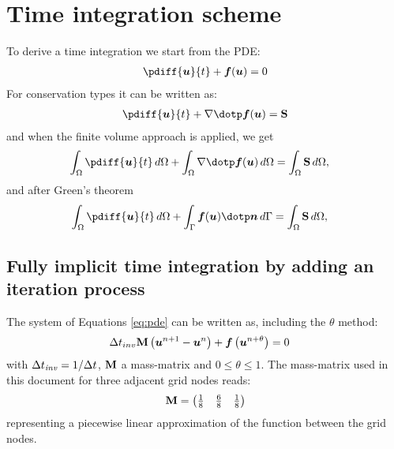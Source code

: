 \chapter{Time integration scheme}\label{sec:time_integration}
To derive a time integration we start from the PDE:
\begin{align}
    \pdiff{\vec{u}}{t} + \vec{f}(\vec{u}) = 0\label{eq:pde}
\end{align}
For conservation types it can be written as:
\begin{align}
    \pdiff{\vec{u}}{t} + \nabla \dotp \vec{f}(\vec{u}) = \mat{S}
\end{align}
and when the finite volume approach is applied, we get
\begin{align}
    \int_\Omega \pdiff{\vec{u}}{t}\, d\Omega + \int_\Omega \nabla \dotp \vec{f}(\vec{u})\, d\Omega&= \int_\Omega \mat{S}\, d\Omega,
\end{align}
and after Green's theorem
\begin{align}
    \int_\Omega \pdiff{\vec{u}}{t}\, d\Omega + \int_\Gamma \vec{f}(\vec{u}) \dotp \vec{n}\, d\Gamma&= \int_\Omega \mat{S}\, d\Omega,
\end{align}
\section{Fully implicit time integration by adding an iteration process}\label{sec:fully_implicit}
The system of Equations \eqref{eq:pde} can be written as, including the $\theta$ method:
\begin{align}
    &\Delta t_{inv} \mbox{\boldmath ${\rm M}$} \left( \bm{u}^{n+1} - \bm{u}^{n} \right)  +
    \bm{f} \left( \bm{u}^{n+\theta} \right) = 0 \label{eq:discretized}
\end{align}
with $\Delta t_{\it inv} = 1/\Delta t$, $\mbox{\boldmath ${\rm M}$}$ a mass-matrix and $0 \leq \theta \leq 1$.
The mass-matrix used in this document for three adjacent grid nodes reads:
\begin{align}
    \mbox{\boldmath ${\rm M}$} = \begin{pmatrix} \frac{1}{8} \quad \frac{6}{8} \quad \frac{1}{8} \end{pmatrix}
    \label{eq:definition_mass_matrix}
\end{align}
representing a piecewise linear approximation of the function between the grid nodes.

